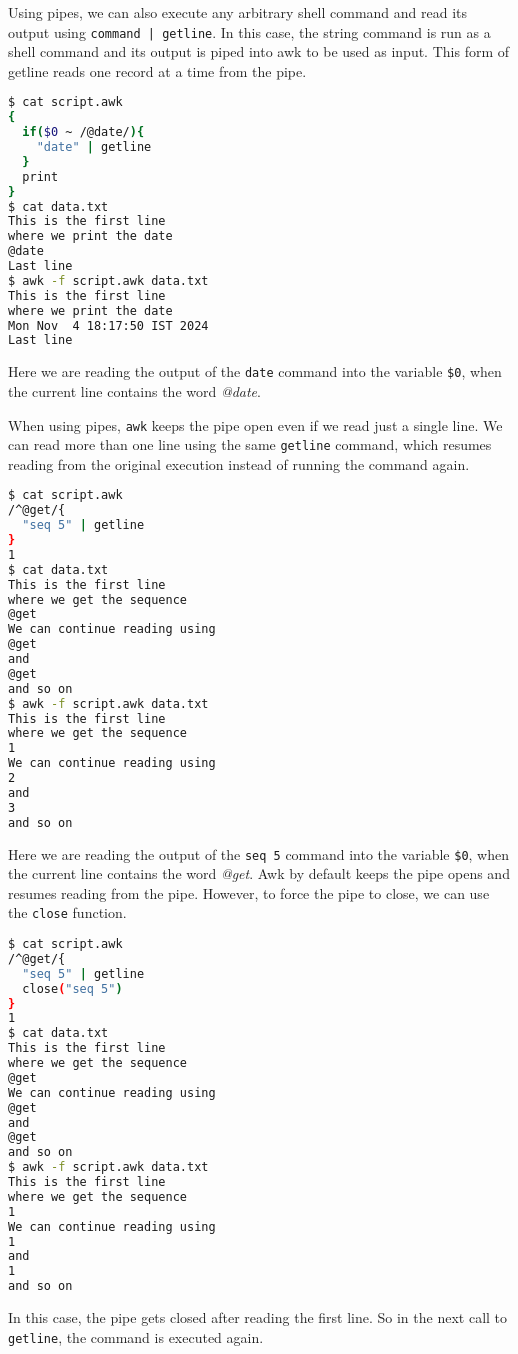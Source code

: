 Using pipes, we can also execute any arbitrary shell command and read its output using \lstinline:command | getline:.
In this case, the string command is run as a shell command and its output is piped into awk to be used as input.
This form of getline reads one record at a time from the pipe.

\begin{lstlisting}[language=bash]
$ cat script.awk
{
  if($0 ~ /@date/){
    "date" | getline
  }
  print 
}
$ cat data.txt
This is the first line
where we print the date
@date
Last line
$ awk -f script.awk data.txt
This is the first line
where we print the date
Mon Nov  4 18:17:50 IST 2024
Last line
\end{lstlisting}

Here we are reading the output of the \lstinline|date| command into the variable \lstinline|$0|,
when the current line contains the word \textit{@date}.

When using pipes, \lstinline|awk| keeps the pipe open even if we read just a single line.
We can read more than one line using the same \lstinline|getline| command,
which resumes reading from the original execution instead of running the command again.

\begin{lstlisting}[language=bash]
$ cat script.awk
/^@get/{
  "seq 5" | getline
}
1
$ cat data.txt
This is the first line
where we get the sequence
@get
We can continue reading using
@get
and
@get
and so on
$ awk -f script.awk data.txt
This is the first line
where we get the sequence
1
We can continue reading using
2
and
3
and so on
\end{lstlisting}

Here we are reading the output of the \lstinline|seq 5| command into the variable \lstinline|$0|,
when the current line contains the word \textit{@get}.
Awk by default keeps the pipe opens and resumes reading from the pipe.
However, to force the pipe to close, we can use the \lstinline|close| function.

\begin{lstlisting}[language=bash]
$ cat script.awk
/^@get/{
  "seq 5" | getline
  close("seq 5")
}
1
$ cat data.txt
This is the first line
where we get the sequence
@get
We can continue reading using
@get
and
@get
and so on
$ awk -f script.awk data.txt
This is the first line
where we get the sequence
1
We can continue reading using
1
and
1
and so on
\end{lstlisting}

In this case, the pipe gets closed after reading the first line.
So in the next call to \lstinline|getline|, the command is executed again.

